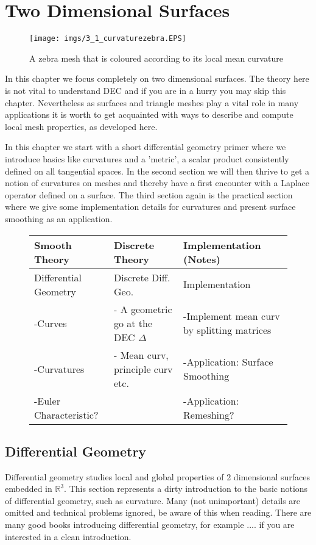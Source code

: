 \newpage
\chapter{Two Dimensional Surfaces}

\begin{figure}[h]
\begin{center}
\texttt{[image: imgs/3\_1\_curvaturezebra.EPS]}
\end{center}
\caption{A zebra mesh that is coloured according to its local mean curvature}
\end{figure}

In this chapter we focus completely on two dimensional surfaces. The theory here is not vital to understand DEC and if you are in a hurry you may skip this chapter. Nevertheless as surfaces and triangle meshes play a vital role in many applications it is worth to get acquainted with ways to describe and compute local mesh properties, as developed here.

In this chapter we start with a short differential geometry primer where we introduce basics like curvatures and a 'metric', a scalar product consistently defined on all tangential spaces. In the second section we will then thrive to get a notion of curvatures on meshes and thereby have a first encounter with a Laplace operator defined on a surface. The third section again is the practical section where we give some implementation details for curvatures and present surface smoothing as an application.

\begin{figure}[b]
\begin{longtable}{|p{4.5cm}|p{4.5cm}|p{4.5cm}|}
\hline
Smooth Theory& Discrete Theory& Implementation (Notes)\\
\hline
Differential Geometry & Discrete Diff. Geo. & Implementation\\
-Curves & - A geometric go at the DEC $\Delta$ & -Implement mean curv by splitting matrices\\
-Curvatures & - Mean curv, principle curv etc.& -Application: Surface Smoothing\\
-Euler Characteristic? & & -Application: Remeshing? \\			
\hline
\end{longtable}
\end{figure}

\section{Differential Geometry}
Differential geometry studies local and global properties of 2 dimensional surfaces embedded in $\mathbb R^3$. This section represents a dirty introduction to the basic notions of differential geometry, such as curvature. Many (not unimportant) details are omitted and technical problems ignored, be aware of this when reading. There are many good books introducing differential geometry, for example .... if you are interested in a clean introduction.

